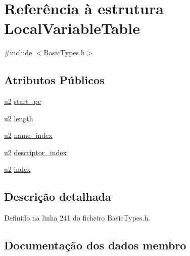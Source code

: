 \hypertarget{structLocalVariableTable}{}\section{Referência à estrutura Local\+Variable\+Table}
\label{structLocalVariableTable}


{\ttfamily \#include $<$Basic\+Types.\+h$>$}

\subsection*{Atributos Públicos}
\begin{DoxyCompactItemize}
\item 
\hyperlink{BasicTypes_8h_a732cde1300aafb73b0ea6c2558a7a54f}{u2} \hyperlink{structLocalVariableTable_a59c9262cde04e95d5600bab33ffa969e}{start\+\_\+pc}
\item 
\hyperlink{BasicTypes_8h_a732cde1300aafb73b0ea6c2558a7a54f}{u2} \hyperlink{structLocalVariableTable_a0027db27baa11c80536bc1042490709f}{length}
\item 
\hyperlink{BasicTypes_8h_a732cde1300aafb73b0ea6c2558a7a54f}{u2} \hyperlink{structLocalVariableTable_ac533f255b730a2442710dd5568cdb151}{name\+\_\+index}
\item 
\hyperlink{BasicTypes_8h_a732cde1300aafb73b0ea6c2558a7a54f}{u2} \hyperlink{structLocalVariableTable_a6cab40caf2e138e8a0196b423bfd7e78}{descriptor\+\_\+index}
\item 
\hyperlink{BasicTypes_8h_a732cde1300aafb73b0ea6c2558a7a54f}{u2} \hyperlink{structLocalVariableTable_ab50a3227c68569b6a040306b1f7ebfd1}{index}
\end{DoxyCompactItemize}


\subsection{Descrição detalhada}


Definido na linha 241 do ficheiro Basic\+Types.\+h.



\subsection{Documentação dos dados membro}
\mbox{\label{structLocalVariableTable_a6cab40caf2e138e8a0196b423bfd7e78}} 
